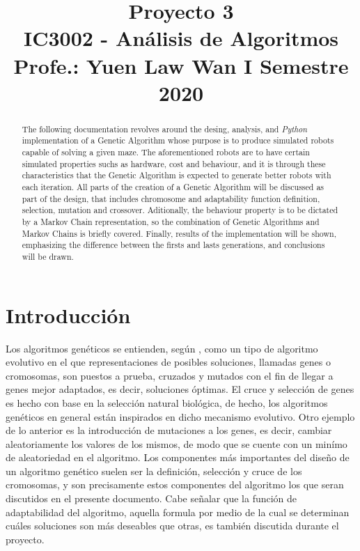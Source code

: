 \documentclass[conference]{IEEEtran}
\begin{document}
\title{Proyecto 3\\
{\footnotesize \textsuperscript{}IC3002 - Análisis de Algoritmos}
{\footnotesize \textsuperscript{}Profe.: Yuen Law Wan}
{\footnotesize \textsuperscript{}I Semestre 2020}
}

\author{
\and
{}
}

\maketitle

\begin{abstract}
The following documentation revolves around the desing, analysis, and \textit{Python} implementation of a Genetic Algorithm whose purpose is to produce simulated robots capable of solving a given maze. The aforementioned robots are to have certain simulated properties suchs as hardware, cost and behaviour, and it is through these characteristics that the Genetic Algorithm is expected to generate better robots with each iteration. All parts of the creation of a Genetic Algorithm will be discussed as part of the design, that includes chromosome and adaptability function definition, selection, mutation and crossover. Aditionally, the behaviour property is to be dictated by a Markov Chain representation, so the combination of Genetic Algorithms and Markov Chains is briefly covered. Finally, results of the implementation will be shown, emphasizing the difference between the firsts and lasts generations, and conclusions will be drawn.
\end{abstract}

\section{Introducción}

Los algoritmos genéticos se entienden, según \cite{b1}, como un tipo de algoritmo evolutivo en el que representaciones de posibles soluciones, llamadas genes o cromosomas, son puestos a prueba, cruzados y mutados con el fin de llegar a genes mejor adaptados, es decir, soluciones óptimas. El cruce y selección de genes es hecho con base en la selección natural biológica, de hecho, los algoritmos genéticos en general están inspirados en dicho mecanismo evolutivo. Otro ejemplo de lo anterior es la introducción de mutaciones a los genes, es decir, cambiar aleatoriamente los valores de los mismos, de modo que  se cuente con un minímo de aleatoriedad en el algoritmo. Los componentes más importantes del diseño de un algoritmo genético suelen ser la definición, selección y cruce de los cromosomas, y son precisamente estos componentes del algoritmo los que seran discutidos en el presente documento. Cabe señalar que la función de adaptabilidad del algoritmo, aquella formula por medio de la cual se determinan cuáles soluciones son más deseables que otras, es también discutida durante el proyecto. 
\end{document}

